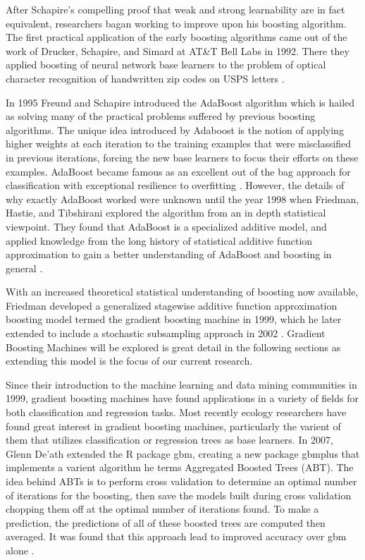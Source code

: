 \documentclass[9pt, conference]{IEEEtran}
\begin{document}
After Schapire's compelling proof that weak and strong learnability are in fact equivalent, researchers bagan working to improve upon his boosting algorithm. The first practical application of the early boosting algorithms came out of the work of Drucker, Schapire, and Simard at AT\&T Bell Labs in 1992. There they applied boosting of neural network base learners to the problem of optical character recognition of handwritten zip codes on USPS letters \cite{OCRDruckerHarrisSchapire}. 

In 1995 Freund and Schapire introduced the AdaBoost algorithm which is hailed as solving many of the practical problems suffered by previous boosting algorithms. The unique idea introduced by Adaboost is the notion of applying higher weights at each iteration to the training examples that were misclassified in previous iterations, forcing the new base learners to focus their efforts on these examples. AdaBoost became famous as an excellent out of the bag approach for classification with exceptional resilience to overfitting \cite{adaboost}.  However, the details of why exactly AdaBoost worked were unknown until the year 1998 when Friedman, Hastie, and Tibshirani explored the algorithm from an in depth statistical viewpoint. They found that AdaBoost is a specialized additive model, and applied knowledge from the long history of statistical additive function approximation to gain a better understanding of AdaBoost and boosting in general \cite{friedman2000}. 

With an increased theoretical statistical understanding of boosting now available, Friedman developed a generalized stagewise additive function approximation boosting model termed the gradient boosting machine in 1999, which he later extended to include a stochastic subsampling approach in 2002 \cite{2001Friedman} \cite{2002Friedman}. Gradient Boosting Machines will be explored is great detail in the following sections as extending this model is the focus of our current research.

Since their introduction to the machine learning and data mining communities in 1999, gradient boosting machines have found applications in a variety of fields for both classification and regression tasks. Most recently ecology researchers have found great interest in gradient boosting machines, particularly the varient of them that utilizes classification or regression trees as base learners. In 2007, Glenn De'ath extended the R package gbm, creating a new package gbmplus that implements a varient algorithm he terms Aggregated Boosted Trees (ABT). The idea behind ABTs is to perform cross validation to determine an optimal number of iterations for the boosting, then save the models built during cross validation chopping them off at the optimal number of iterations found. To make a prediction, the predictions of all of these boosted trees are computed then averaged. It was found that this approach lead to improved accuracy over gbm alone \cite{death2007ABT}.
\end{document}
